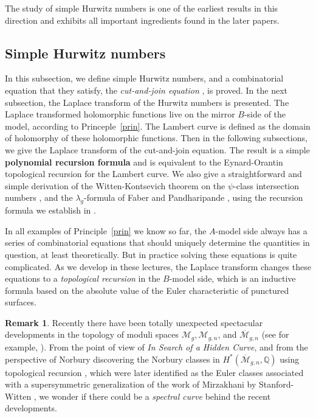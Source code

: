 \documentclass{amsart}
\theoremstyle{definition}
\newtheorem{rem}[thm]{Remark}
\numberwithin{equation}{section}
\numberwithin{figure}{section}
\newcommand{\Mbar}{{\overline{\mathcal{M}}}}
\newcommand{\bQ}{{\mathbb{Q}}}
\newcommand{\cM}{{\mathcal{M}}}
\begin{document}
The study of simple Hurwitz numbers
is one of the earliest results in this direction and  exhibits 
all important ingredients found in the later 
papers. 


\subsection{Simple Hurwitz numbers}
In this subsection, we define simple Hurwitz 
numbers, and a combinatorial 
equation that they satisfy, the \emph{cut-and-join
equation} \cite{GJ, V},  is proved.
In the next subsection, the Laplace transform of the
Hurwitz numbers is presented. The Laplace
transformed holomorphic functions live on 
the mirror $B$-side of the model,
according to Princeple~\ref{prin}. 
The Lambert curve is defined as the
domain of holomorphy of these holomorphic
functions.
Then in the following subsections, we give the Laplace transform
of the cut-and-join equation. The result is a
simple \textbf{polynomial recursion formula}
and is equivalent to the Eynard-Orantin topological recursion
for the Lambert curve. We also give a 
straightforward and simple
derivation \cite{MZ} of the Witten-Kontsevich theorem
on the $\psi$-class intersection numbers
\cite{DVV, K1992, W1991},
and the $\lambda_g$-formula of Faber and Pandharipande
\cite{FP1,FP2}, using the recursion formula we establish
in \cite{MZ}.




 In all examples of Principle~\ref{prin}
we know so far, the $A$-model side always has a series of 
combinatorial equations that should uniquely determine 
the quantities in question, at least
theoretically. But in practice solving these
equations is quite complicated. 
As we develop in these lectures, the Laplace
transform changes these equations to a
\emph{topological recursion} in the $B$-model 
side, which is an inductive formula based 
 on the absolute value of the Euler 
characteristic of  punctured surfaces.


\begin{rem}
Recently there have been  totally unexpected spectacular developments 
in the topology
of moduli spaces $\cM_g, \cM_{g,n}$, and $\Mbar_{g,n}$ 
(see for example, \cite{CLP}).  
From the point of view of \emph{In Search of a Hidden Curve}, 
and from the perspective of Norbury discovering the Norbury classes
in $H^*(\Mbar_{g,n}, \bQ)$ using topological recursion
\cite{N4}, which
were later identified as the Euler classes associated with a 
supersymmetric generalization of the work of Mirzakhani
by Stanford-Witten \cite{SW}, we wonder if there could be a
\emph{spectral curve} behind the  recent
developments. 
\end{rem}
\end{document}
